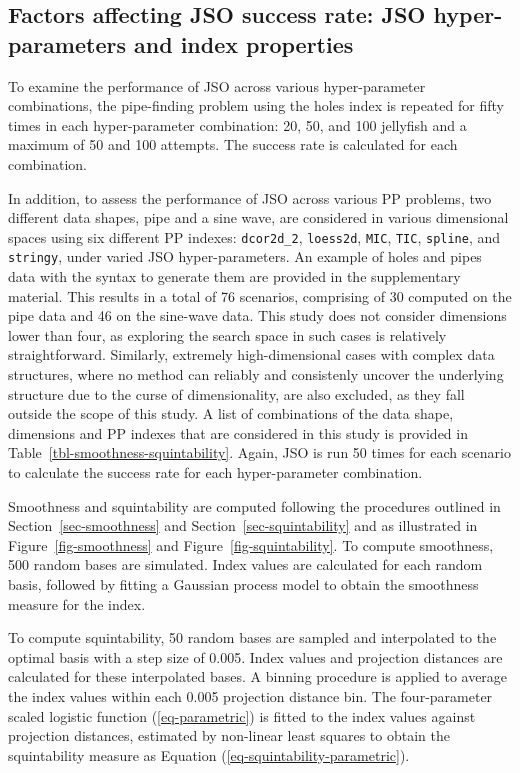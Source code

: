 \documentclass[
  12pt,
]{interact}
\theoremstyle{plain}
\begin{document}
\subsection{Factors affecting JSO success rate: JSO hyper-parameters and
index properties}\label{sec-app-2}

To examine the performance of JSO across various hyper-parameter
combinations, the pipe-finding problem using the holes index is repeated
for fifty times in each hyper-parameter combination: 20, 50, and 100
jellyfish and a maximum of 50 and 100 attempts. The success rate is
calculated for each combination.

In addition, to assess the performance of JSO across various PP
problems, two different data shapes, pipe and a sine wave, are
considered in various dimensional spaces using six different PP indexes:
\texttt{dcor2d\_2}, \texttt{loess2d}, \texttt{MIC}, \texttt{TIC},
\texttt{spline}, and \texttt{stringy}, under varied JSO
hyper-parameters. An example of holes and pipes data with the syntax to
generate them are provided in the supplementary material. This results
in a total of 76 scenarios, comprising of 30 computed on the pipe data
and 46 on the sine-wave data. This study does not consider dimensions
lower than four, as exploring the search space in such cases is
relatively straightforward. Similarly, extremely high-dimensional cases
with complex data structures, where no method can reliably and
consistenly uncover the underlying structure due to the curse of
dimensionality, are also excluded, as they fall outside the scope of
this study. A list of combinations of the data shape, dimensions and PP
indexes that are considered in this study is provided in
Table~\ref{tbl-smoothness-squintability}. Again, JSO is run 50 times for
each scenario to calculate the success rate for each hyper-parameter
combination.

Smoothness and squintability are computed following the procedures
outlined in Section~\ref{sec-smoothness} and
Section~\ref{sec-squintability} and as illustrated in
Figure~\ref{fig-smoothness} and Figure~\ref{fig-squintability}. To
compute smoothness, 500 random bases are simulated. Index values are
calculated for each random basis, followed by fitting a Gaussian process
model to obtain the smoothness measure for the index.

To compute squintability, 50 random bases are sampled and interpolated
to the optimal basis with a step size of 0.005. Index values and
projection distances are calculated for these interpolated bases. A
binning procedure is applied to average the index values within each
0.005 projection distance bin. The four-parameter scaled logistic
function (\ref{eq-parametric}) is fitted to the index values against
projection distances, estimated by non-linear least squares to obtain
the squintability measure as Equation
(\ref{eq-squintability-parametric}).
\end{document}
